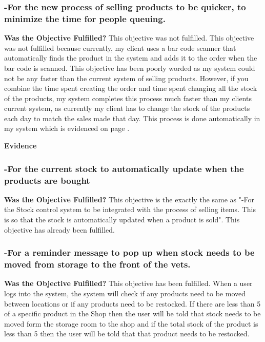 \subsubsection{-For the new process of selling products to be quicker, to minimize the time for people queuing.}
\textbf{Was the Objective Fulfilled?} \newline
This objective was not fulfilled. This objective was not fulfilled because currently, my client uses a bar code scanner that automatically finds the product in the system and adds it to the order when the bar code is scanned. This objective has been poorly worded as my system could not be any faster than the current system of selling products. However, if you combine the time spent creating the order and time spent changing all the stock of the products, my system completes this process much faster than my clients current system, as currently my client has to change the stock of the products each day to match the sales made that day. This process is done automatically in my system which is evidenced on page \pageref{}.\newline

\textbf{Evidence} \newline




\subsubsection{-For the current stock to automatically update when the products are bought}
\textbf{Was the Objective Fulfilled?} \newline
This objective is the exactly the same as "-For the Stock control system to be integrated with the process of selling items. This is so that the stock is automatically updated when a product is sold". This objective has already been fulfilled.




\subsubsection{-For a reminder message to pop up when stock needs to be moved from storage to the front of the vets. }
\textbf{Was the Objective Fulfilled?} \newline
This objective has been fulfilled. When a user logs into the system, the system will check if any products need to be moved between locations or if any products need to be restocked. If there are less than 5 of a specific product in the Shop then the user will be told that stock needs to be moved form the storage room to the shop and if the total stock of the product is less than 5 then the user will be told that that product needs to be restocked.\newline

